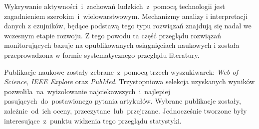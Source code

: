 Wykrywanie aktywności~i~zachowań ludzkich~z~pomocą technologii jest zagadnieniem szerokim~i~wielowarstwowym. Mechanizmy analizy i interpretacji danych z czujników, będące podstawą tego typu rozwiązań znajdują się nadal we wczesnym etapie rozwoju. Z tego powodu ta część przeglądu rozwiązań monitorujących bazuje na opublikowanych osiągnięciach naukowych i została przeprowadzona w formie systematycznego przeglądu literatury. 

Publikacje naukowe zostały zebrane~z~pomocą trzech wyszukiwarek: \textit{Web of Science}, \textit{IEEE Explore} oraz \textit{PubMed}. Trzystopniowa selekcja uzyskanych wyników pozwoliła~na~wyizolowanie najciekawszych~i~najlepiej pasujących~do~postawionego pytania artykułów. Wybrane publikacje zostały, zależnie~od~ich oceny, przeczytane~lub~przejrzane. Jednocześnie tworzone były interesujące~z~punktu widzenia tego przeglądu statystyki. 
